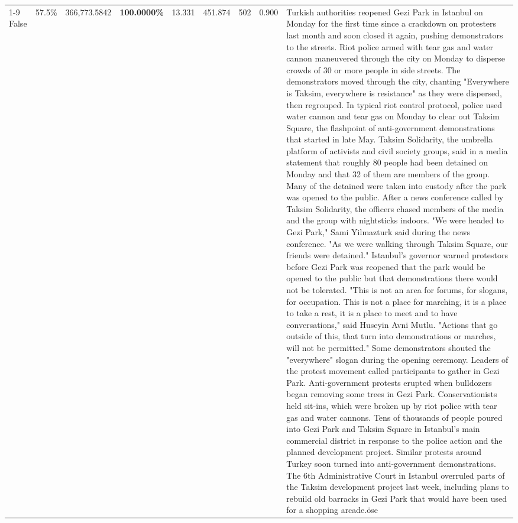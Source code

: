 \begin{table}[H]
\begin{tabular}{lllrlllll}
\cline{1-9}
False & 57.5\% & 366,773.5842 & \bfseries \color{red} 100.0000\% & 13.331 & 451.874 & 502 & 0.900 & Turkish authorities reopened Gezi Park in Istanbul on Monday for the first time since a crackdown on protesters last month and soon closed it again, pushing demonstrators to the streets. Riot police armed with tear gas and water cannon maneuvered through the city on Monday to disperse crowds of 30 or more people in side streets. The demonstrators moved through the city, chanting "Everywhere is Taksim, everywhere is resistance" as they were dispersed, then regrouped. In typical riot control protocol, police used water cannon and tear gas on Monday to clear out Taksim Square, the flashpoint of anti-government demonstrations that started in late May. Taksim Solidarity, the umbrella platform of activists and civil society groups, said in a media statement that roughly 80 people had been detained on Monday and that 32 of them are members of the group. Many of the detained were taken into custody after the park was opened to the public. After a news conference called by Taksim Solidarity, the officers chased members of the media and the group with nightsticks indoors. "We were headed to Gezi Park," Sami Yilmazturk said during the news conference. "As we were walking through Taksim Square, our friends were detained." Istanbul's governor warned protestors before Gezi Park was reopened that the park would be opened to the public but that demonstrations there would not be tolerated. "This is not an area for forums, for slogans, for occupation. This is not a place for marching, it is a place to take a rest, it is a place to meet and to have conversations," said Huseyin Avni Mutlu. "Actions that go outside of this, that turn into demonstrations or marches, will not be permitted." Some demonstrators shouted the "everywhere" slogan during the opening ceremony. Leaders of the protest movement called participants to gather in Gezi Park. Anti-government protests erupted when bulldozers began removing some trees in Gezi Park. Conservationists held sit-ins, which were broken up by riot police with tear gas and water cannons. Tens of thousands of people poured into Gezi Park and Taksim Square in Istanbul's main commercial district in response to the police action and the planned development project. Similar protests around Turkey soon turned into anti-government demonstrations. The 6th Administrative Court in Istanbul overruled parts of the Taksim development project last week, including plans to rebuild old barracks in Gezi Park that would have been used for a shopping arcade.öse \\

\end{tabular}
\end{table}
